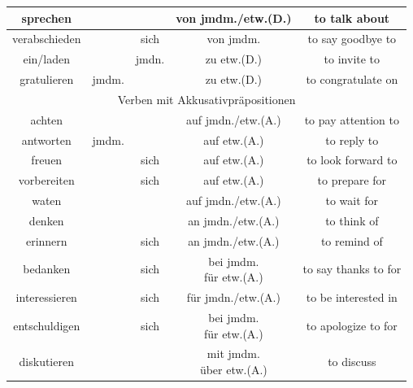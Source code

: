 \begin{center}
\begin{longtable}{|c|c|c|c|c|}
        \hline
        sprechen      &       &       & von jmdm./etw.(D.)  & to talk about             \\
        \hline
        verabschieden &       & sich  & von jmdm.           & to say goodbye to         \\
        \hhline{|=====|}
        ein/laden     &       & jmdn. & zu etw.(D.)         & to invite to              \\
        \hline
        gratulieren   & jmdm. &       & zu etw.(D.)         & to congratulate on        \\
        \hline
        \multicolumn{5}{|c|}{Verben mit Akkusativpräpositionen}                         \\
        \hline
        achten        &       &       & auf jmdn./etw.(A.)  & to pay attention to       \\
        \hline
        antworten     & jmdm. &       & auf etw.(A.)        & to reply to               \\
        \hline
        freuen        &       & sich  & auf etw.(A.)        & to look forward to        \\
        \hline
        vorbereiten   &       & sich  & auf etw.(A.)        & to prepare for            \\
        \hline
        waten         &       &       & auf jmdn./etw.(A.)  & to wait for               \\
        \hhline{|=====|}
        denken        &       &       & an jmdn./etw.(A.)   & to think of               \\
        \hline
        erinnern      &       & sich  & an jmdn./etw.(A.)   & to remind of              \\
        \hhline{|=====|}
        bedanken      &       & sich  & \makecell{bei jmdm.                             \\ für etw.(A.)}   & to say thanks to for        \\
        \hline
        interessieren &       & sich  & für jmdn./etw.(A.)  & to be interested in       \\
        \hline
        entschuldigen &       & sich  & \makecell{bei jmdm.                             \\ für etw.(A.)}  & to apologize to for \\
        \hhline{|=====|}
        diskutieren   &       &       & \makecell{mit jmdm.                             \\ über etw.(A.)}  & to discuss \\

\end{longtable}
\end{center}
